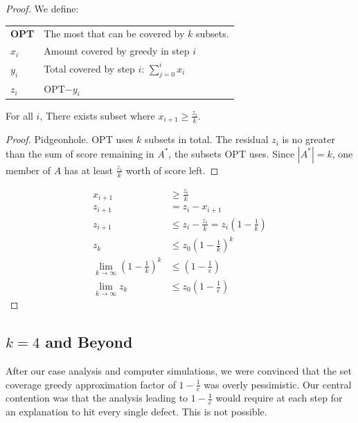 \begin{proof} We define:

\begin{tabularx}{\linewidth}{l X}
{\bf OPT} & The most that can be covered by $k$ subsets. \\
{\bf $x_i$} & Amount covered by greedy in step $i$ \\
{\bf $y_i$} & Total covered by step $i$: $\sum_{j=0}^i x_i$ \\
{\bf $z_i$} & OPT$-y_i$ \\
\end{tabularx}

\begin{lem} \label{lem:MaxPidgeonhole}
For all $i$,  There exists subset where $x_{i+1} \geq \frac{z_i}{k}$.  
\end{lem}

\begin{proof}
Pidgeonhole.  OPT uses $k$ subsets in total.  The residual $z_i$ is no greater than the sum of score remaining in $A^*$, the subsets OPT uses. Since $ |A^*| = k$, one member of $A$ has at least $ \frac{z_i}{k}$ worth of score left. 
\end{proof}

\begin{eqnarray*}
x_{i+1} &\geq \frac{z_i}{k} \\
z_{i+1} &= z_i - x_{i+1} \\
z_{i+1} &\leq z_i - \frac{z_i}{k} = z_i( 1 - \frac{1}{k} ) \\
z_k    &\leq z_0 ( 1 - \frac{1}{k} )^k \\
\lim_{k \rightarrow \infty} ( 1 - \frac{1}{k} )^k &\leq ( 1 - \frac{1}{e}) \\
\lim_{k \rightarrow \infty} z_k &\leq z_0(1 -  \frac{1}{e}) 
\end{eqnarray*}

\end{proof}

\subsection{$k=4$ and Beyond}

After our case analysis and computer simulations, we were convinced that the set coverage greedy approximation factor of $1-\frac{1}{e}$ was overly pessimistic.  Our central contention was that the analysis leading to $1-\frac{1}{e}$ would require at each step for an explanation to hit every single defect.  This is not possible.

